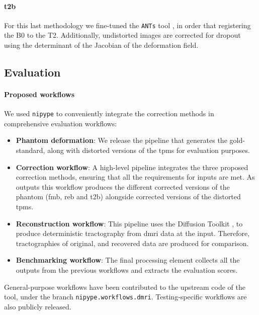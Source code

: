 \paragraph{\Gls*{t2b}} For this last methodology
we fine-tuned the \texttt{ANTs} tool \cite{avants_ants:_2013},
in order that registering the B0 to the T2. Additionally,
undistorted images are corrected for dropout using the determinant
of the Jacobian of the deformation field.

\subsection{Evaluation}

\paragraph*{Proposed workflows}
We used \texttt{nipype} \cite{gorgolewski_nipype:_2011}
to conveniently integrate the correction methods in
comprehensive evaluation workflows:

\begin{itemize}
\item \textbf{Phantom deformation}: We release the pipeline
that generates the gold-standard, along with
distorted versions of the \glspl*{tpm} for
evaluation purposes.
\item \textbf{Correction workflow}: A high-level pipeline
integrates the three proposed correction methods,
ensuring that all the requirements for inputs are
met. As outputs this workflow produces the different
corrected versions of the phantom (\gls*{fmb}, \gls*{reb}
and \gls*{t2b}) alongside corrected versions of the
distorted \glspl*{tpm}.
\item \textbf{Reconstruction workflow}: This pipeline uses
the Diffusion Toolkit \cite{wang_diffusion_2007}, 
to produce deterministic tractography
from \gls*{dmri} data at the input. Therefore,
tractographies of original, and recovered data
are produced for comparison.
\item \textbf{Benchmarking workflow}: The final processing
element collects all the outputs from the previous
workflows and extracts the evaluation scores.
\end{itemize}
General-purpose 
workflows have been contributed to the upstream code
of the tool, under the branch \texttt{nipype.workflows.dmri}.
Testing-specific workflows are also publicly released.

